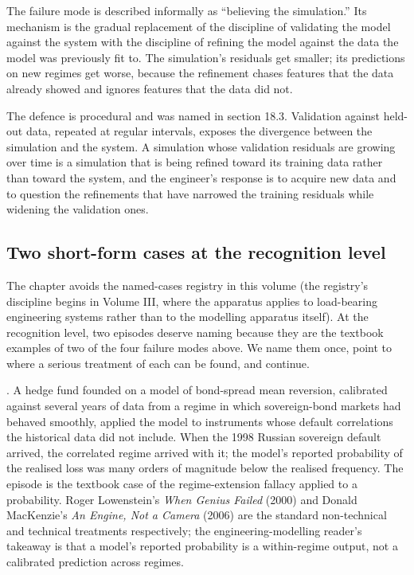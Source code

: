 The failure mode is described informally as ``believing the
simulation.'' Its mechanism is the gradual replacement of the
discipline of validating the model against the system with the
discipline of refining the model against the data the model
was previously fit to. The simulation's residuals get smaller;
its predictions on new regimes get worse, because the
refinement chases features that the data already showed and
ignores features that the data did not.

The defence is procedural and was named in section 18.3.
Validation against held-out data, repeated at regular intervals,
exposes the divergence between the simulation and the system.
A simulation whose validation residuals are growing over time
is a simulation that is being refined toward its training data
rather than toward the system, and the engineer's response is to
acquire new data and to question the refinements that have
narrowed the training residuals while widening the validation
ones.

\subsection{Two short-form cases at the recognition level}

The chapter avoids the named-cases registry in this volume (the
registry's discipline begins in Volume III, where the apparatus
applies to load-bearing engineering systems rather than to the
modelling apparatus itself). At the recognition level, two episodes
deserve naming because they are the textbook examples of two of the
four failure modes above. We name them once, point to where a
serious treatment of each can be found, and continue.

. A hedge fund founded
on a model of bond-spread mean reversion, calibrated against several
years of data from a regime in which sovereign-bond markets had
behaved smoothly, applied the model to instruments whose default
correlations the historical data did not include. When the 1998
Russian sovereign default arrived, the correlated regime arrived
with it; the model's reported probability of the realised loss was
many orders of magnitude below the realised frequency. The episode
is the textbook case of the regime-extension fallacy applied to a
probability. Roger Lowenstein's \emph{When Genius Failed} (2000)
and Donald MacKenzie's \emph{An Engine, Not a Camera} (2006) are the
standard non-technical and technical treatments respectively; the
engineering-modelling reader's takeaway is that a model's reported
probability is a within-regime output, not a calibrated prediction
across regimes.

